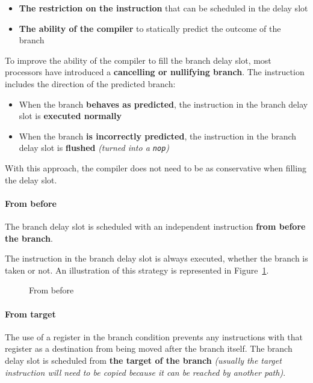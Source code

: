\documentclass[english]{article}
\begin{document}
\begin{itemize}
  \item \textbf{The restriction on the instruction} that can be scheduled in the delay slot
  \item \textbf{The ability of the compiler} to statically predict the outcome of the branch
\end{itemize}

To improve the ability of the compiler to fill the branch delay slot, most processors have introduced a \textbf{cancelling or nullifying branch}.
The instruction includes the direction of the predicted branch:

\begin{itemize}
  \item When the branch \textbf{behaves as predicted}, the instruction in the branch delay slot is \textbf{executed normally}
  \item When the branch \textbf{is incorrectly predicted}, the instruction in the branch delay slot is \textbf{flushed} \textit{(turned into a \texttt{nop})}
\end{itemize}

With this approach, the compiler does not need to be as conservative when filling the delay slot.

\paragraph{From before}

The branch delay slot is scheduled with an independent instruction \textbf{from before the branch}.

The instruction in the branch delay slot is always executed, whether the branch is taken or not.
An illustration of this strategy is represented in Figure~\ref{fig:from-before}.

\begin{figure}[htbp]
  \bigskip
  \centering
  \caption{From before}
  \label{fig:from-before}
  \bigskip
\end{figure}

\paragraph{From target}

The use of a register in the branch condition prevents any instructions with that register as a destination from being moved after the branch itself.
The branch delay slot is scheduled from \textbf{the target of the branch} \textit{(usually the target instruction will need to be copied because it can be reached by another path)}.
\end{document}
